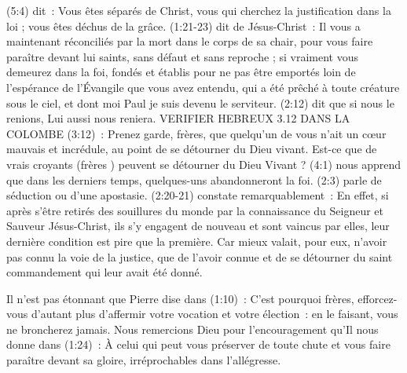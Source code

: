 \begin{enumerate}
\begin{specialpar}{}
(5:4) dit~:
 \og Vous êtes séparés de Christ, vous qui cherchez la justification
 dans la loi ; vous êtes déchus de la grâce. \fg{}
 (1:21-23) dit de Jésus-Christ~:
 \og Il vous a maintenant réconciliés par la mort dans le corps de sa chair,
 pour vous faire paraître devant lui saints, sans défaut et sans reproche ;
 si vraiment vous demeurez dans la foi, fondés et établis pour ne pas être
 emportés loin de l'espérance de l'Évangile que vous avez entendu,
 qui a été prêché à toute créature sous le ciel, et dont moi Paul
 je suis devenu le serviteur. \fg{}
 (2:12) dit que \og si nous le renions, Lui aussi nous reniera. \fg{}
 \ocadr VERIFIER HEBREUX 3.12 DANS LA COLOMBE \fcadr
 (3:12)~: \og Prenez garde, frères, que quelqu'un de vous n'ait un cœur mauvais
 et incrédule, au point de se détourner du Dieu vivant. \fg{}
 Est-ce que de vrais croyants (\og frères \fg{}) peuvent se détourner du Dieu Vivant ?
 (4:1) nous apprend que \og dans les derniers temps,
 quelques-uns abandonneront la foi. \fg{}
 (2:3) parle de \og séduction \fg{} ou d'une apostasie.
 (2:20-21) constate remarquablement~: \og En effet, si après s'être retirés
 des souillures du monde par la connaissance du Seigneur et Sauveur Jésus-Christ,
 ils s'y engagent de nouveau et sont vaincus par elles, leur dernière condition
 est pire que la première.
 Car mieux valait, pour eux, n'avoir pas connu la voie de la justice,
 que de l'avoir connue et de se détourner du saint commandement
 qui leur avait été donné. \fg{}
\end{specialpar}

\begin{specialpar}{}
Il n'est pas étonnant que Pierre dise dans (1:10)~:
 \og C'est pourquoi frères, efforcez-vous d'autant plus d'affermir
 votre vocation et votre élection~: en le faisant, vous ne broncherez jamais. \fg{}
Nous remercions Dieu pour l'encouragement qu'Il nous donne dans (1:24)~:
 \og À celui qui peut vous préserver de toute chute et vous faire paraître
 devant sa gloire, irréprochables dans l'allégresse. \fg{}
\end{specialpar}


\end{enumerate}
